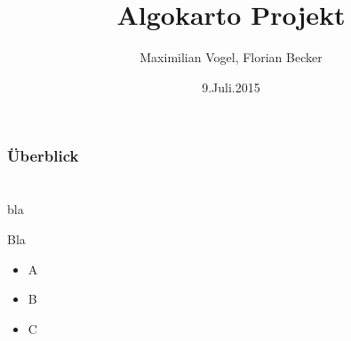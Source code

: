 \documentclass[14pt]{beamer}
\title[AlgoKarto]{Algokarto Projekt}
\author[Maximilian Vogel, Florian Becker]{Maximilian Vogel, Florian Becker}
\date[9.Juli.2015]{9.Juli.2015}
\begin{document}
\begin{frame}
\large
  \titlepage
\end{frame}


\begin{frame}
  \frametitle{Überblick}
\end{frame}


\section{}
\begin{frame}{bla}

  \begin{block}{Bla}

    \begin{center}
    \end{center}

  \end{block}

\end{frame}


\begin{frame}{}
  \begin{itemize}
        \item A
        \item B
        \item C
  \end{itemize}
\end{frame}
\end{document}
